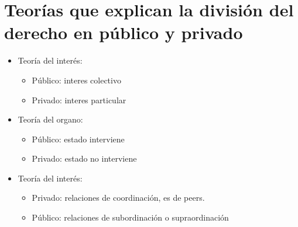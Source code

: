 \section{Teorías que explican la división del derecho en público y privado}
\begin{itemize}
\item Teoría del interés:
\begin{itemize}
    \item Público: interes colectivo
    \item Privado: interes particular 
\end{itemize}

\item Teoría del organo:
\begin{itemize}
    \item Público: estado interviene 
    \item Privado: estado no interviene
\end{itemize}

\item Teoría del interés:
\begin{itemize}
    \item Privado: relaciones de coordinación, es de peers.
    \item Público: relaciones de subordinación o supraordinación
\end{itemize}
\end{itemize}

